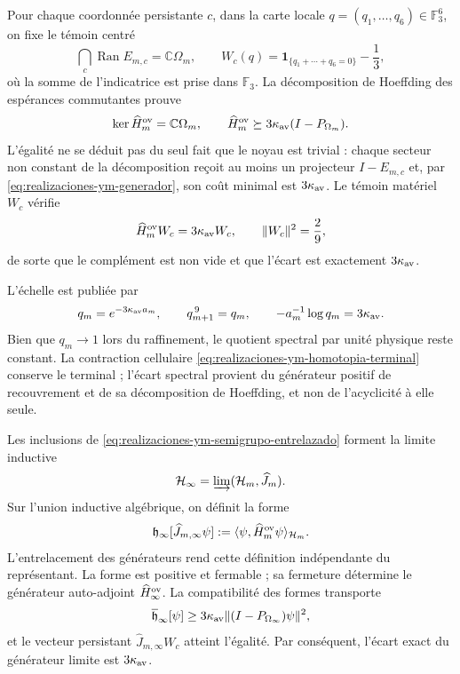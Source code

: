 Pour chaque coordonnée persistante \(c\), dans la carte locale
\(q=(q_1,\ldots,q_6)\in\mathbb F_3^6\), on fixe le témoin centré
\begin{equation}\label{eq:realizaciones-ym-testigo-definicion}
 \bigcap_c\operatorname{Ran}E_{m,c}=\mathbb C\Omega_m,
 \qquad
 W_c(q)=\mathbf 1_{\{q_1+\cdots+q_6=0\}}-\frac13,
\end{equation}
où la somme de l’indicatrice est prise dans \(\mathbb F_3\). La décomposition de
Hoeffding des espérances commutantes prouve
\begin{equation}\label{eq:realizaciones-ym-gap-finito}
 \ker\widehat H_m^{\rm ov}=\mathbb C\Omega_m,
 \qquad
 \widehat H_m^{\rm ov}\succeq
 3\kappa_{\rm av}(I-P_{\Omega_m}).
\end{equation}
L’égalité ne se déduit pas du seul fait que le noyau est trivial : chaque secteur non
constant de la décomposition reçoit au moins un projecteur
\(I-E_{m,c}\) et, par \eqref{eq:realizaciones-ym-generador}, son coût minimal
est \(3\kappa_{\rm av}\). Le témoin matériel \(W_c\) vérifie
\begin{equation}\label{eq:realizaciones-ym-testigo-gap}
 \widehat H_m^{\rm ov}W_c=3\kappa_{\rm av}W_c,
 \qquad \|W_c\|^2=\frac29,
\end{equation}
de sorte que le complément est non vide et que l’écart est exactement
\(3\kappa_{\rm av}\).

L'échelle est publiée par
\begin{equation}\label{eq:realizaciones-ym-qm}
 q_m=e^{-3\kappa_{\rm av}a_m},
 \qquad q_{m+1}^{\,9}=q_m,
 \qquad -a_m^{-1}\log q_m=3\kappa_{\rm av}.
\end{equation}
Bien que \(q_m\to1\) lors du raffinement, le quotient spectral par unité physique reste constant. La contraction cellulaire \eqref{eq:realizaciones-ym-homotopia-terminal} conserve le terminal ; l'écart spectral provient du générateur positif de recouvrement et de sa décomposition de Hoeffding, et non de l'acyclicité à elle seule.

Les inclusions de \eqref{eq:realizaciones-ym-semigrupo-entrelazado}
forment la limite inductive
\begin{equation}\label{eq:realizaciones-ym-colimite}
 \mathcal H_\infty=\varinjlim(\mathcal H_m,\widehat J_m).
\end{equation}
Sur l’union inductive algébrique, on définit la forme
\begin{equation}\label{eq:realizaciones-ym-forma-limite}
 \mathfrak h_\infty[\widehat J_{m,\infty}\psi]
 :=\langle\psi,\widehat H_m^{\rm ov}\psi\rangle_{\mathcal H_m}.
\end{equation}
L’entrelacement des générateurs rend cette définition
indépendante du représentant. La forme est positive et fermable ; sa
fermeture détermine le générateur auto-adjoint \(\widehat H_\infty^{\rm ov}\).
La compatibilité des formes transporte
\begin{equation}\label{eq:realizaciones-ym-gap-forma-limite}
 \overline{\mathfrak h}_\infty[\psi]
 \geq3\kappa_{\rm av}
 \|(I-P_{\Omega_\infty})\psi\|^2,
\end{equation}
et le vecteur persistant
\(\widehat J_{m,\infty}W_c\) atteint l’égalité. Par conséquent,
l’écart exact du générateur limite est \(3\kappa_{\rm av}\).

